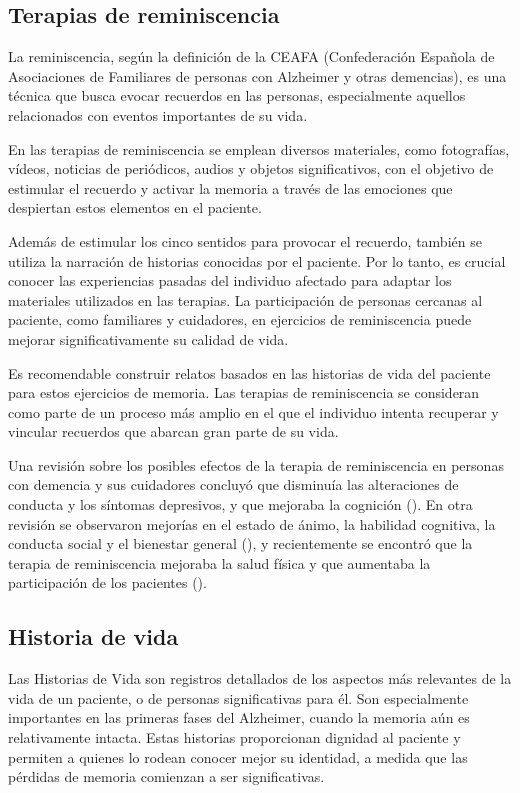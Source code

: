 \subsection{Terapias de reminiscencia}
La reminiscencia, según la definición de la CEAFA (Confederación Española de Asociaciones de Familiares de personas con Alzheimer y otras demencias), es una técnica que busca evocar recuerdos en las personas, especialmente aquellos relacionados con eventos importantes de su vida.

En las terapias de reminiscencia se emplean diversos materiales, como fotografías, vídeos, noticias de periódicos, audios y objetos significativos, con el objetivo de estimular el recuerdo y activar la memoria a través de las emociones que despiertan estos elementos en el paciente.

Además de estimular los cinco sentidos para provocar el recuerdo, también se utiliza la narración de historias conocidas por el paciente. Por lo tanto, es crucial conocer las experiencias pasadas del individuo afectado para adaptar los materiales utilizados en las terapias. La participación de personas cercanas al paciente, como familiares y cuidadores, en ejercicios de reminiscencia puede mejorar significativamente su calidad de vida.

Es recomendable construir relatos basados en las historias de vida del paciente para estos ejercicios de memoria. Las terapias de reminiscencia se consideran como parte de un proceso más amplio en el que el individuo intenta recuperar y vincular recuerdos que abarcan gran parte de su vida.

Una revisión sobre los posibles efectos de la terapia de reminiscencia en personas con demencia y sus cuidadores concluyó que disminuía las alteraciones de conducta y los síntomas depresivos, y que mejoraba la cognición (\cite{huang2015reminiscence}). En otra revisión se observaron mejorías en el estado de ánimo, la habilidad cognitiva, la conducta social y el bienestar general (\cite{cotelli2012reminiscence}), y recientemente se encontró que la terapia de reminiscencia mejoraba la salud física y que
aumentaba la participación de los pacientes (\cite{irazoki2027eficacia}).
\subsection{Historia de vida}
Las Historias de Vida son registros detallados de los aspectos más relevantes de la vida de un paciente, o de personas significativas para él. Son especialmente importantes en las primeras fases del Alzheimer, cuando la memoria aún es relativamente intacta. Estas historias proporcionan dignidad al paciente y permiten a quienes lo rodean conocer mejor su identidad, a medida que las pérdidas de memoria comienzan a ser significativas.

